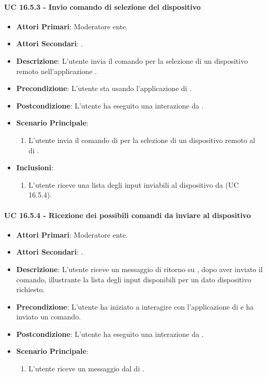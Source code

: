 		\paragraph{UC 16.5.3 - Invio comando di selezione del dispositivo}
		\begin{itemize}
			\item \textbf{Attori Primari}: Moderatore ente.
			\item \textbf{Attori Secondari}: .
			\item \textbf{Descrizione}: L'utente invia il comando per la selezione di un dispositivo remoto nell'applicazione .
			\item \textbf{Precondizione}: L'utente sta usando l'applicazione di .
			\item \textbf{Postcondizione}: L'utente ha eseguito una interazione da .
			\item \textbf{Scenario Principale}:
			\begin{enumerate}
				\item L'utente invia il comando di per la selezione di un dispositivo remoto al  di .
			\end{enumerate}
			\item \textbf{Inclusioni}:
			\begin{enumerate}
				\item L'utente riceve una lista degli input inviabili al dispositivo da  (UC 16.5.4).
			\end{enumerate}
		\end{itemize}

		\paragraph{UC 16.5.4 - Ricezione dei possibili comandi da inviare al dispositivo }
		\begin{itemize}
			\item \textbf{Attori Primari}: Moderatore ente.
			\item \textbf{Attori Secondari}: .
			\item \textbf{Descrizione}: L'utente riceve un messaggio di ritorno su , dopo aver inviato il comando, illustrante la lista degli input disponibili per un dato dispositivo richiesto. 
			\item \textbf{Precondizione}: L'utente ha iniziato a interagire con l'applicazione di  e ha inviato un comando.
			\item \textbf{Postcondizione}: L'utente ha eseguito una interazione da .
			\item \textbf{Scenario Principale}:
			\begin{enumerate}
				\item L'utente riceve un messaggio dal  di .
			\end{enumerate}
		\end{itemize}	

